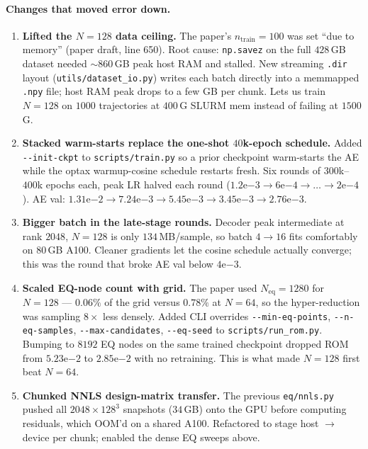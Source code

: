 \paragraph{Changes that moved error down.}
\begin{enumerate}
  \item \textbf{Lifted the $N=128$ data ceiling.} The paper's
  $n_\mathrm{train}{=}100$ was set ``due to memory'' (paper draft, line
  650). Root cause: \texttt{np.savez} on the full $428$\,GB dataset
  needed ${\sim}860$\,GB peak host RAM and stalled. New streaming
  \texttt{.dir} layout (\texttt{utils/dataset\_io.py}) writes each
  batch directly into a memmapped \texttt{.npy} file; host RAM peak
  drops to a few GB per chunk. Lets us train $N=128$ on $1000$
  trajectories at $400$\,G SLURM mem instead of failing at $1500$\,G.
  \item \textbf{Stacked warm-starts replace the one-shot $40$k-epoch
  schedule.} Added \texttt{-{}-init-ckpt} to \texttt{scripts/train.py}
  so a prior checkpoint warm-starts the AE while the optax
  warmup-cosine schedule restarts fresh. Six rounds of $300$k--$400$k
  epochs each, peak LR halved each round
  ($1.2\mathrm{e}{-3} \to 6\mathrm{e}{-4} \to \ldots \to 2\mathrm{e}{-4}$).
  AE val: $1.31\mathrm{e}{-2} \to 7.24\mathrm{e}{-3} \to
  5.45\mathrm{e}{-3} \to 3.45\mathrm{e}{-3} \to 2.76\mathrm{e}{-3}$.
  \item \textbf{Bigger batch in the late-stage rounds.} Decoder peak
  intermediate at rank $2048$, $N{=}128$ is only $134$\,MB/sample, so
  batch $4 \to 16$ fits comfortably on 80\,GB A100. Cleaner gradients
  let the cosine schedule actually converge; this was the round that
  broke AE val below $4\mathrm{e}{-3}$.
  \item \textbf{Scaled EQ-node count with grid.} The paper used
  $N_\mathrm{eq}{=}1280$ for $N{=}128$ --- $0.06\%$ of the grid versus
  $0.78\%$ at $N{=}64$, so the hyper-reduction was sampling $8\times$
  less densely. Added CLI overrides
  \texttt{-{}-min-eq-points}, \texttt{-{}-n-eq-samples}, \texttt{-{}-max-candidates},
  \texttt{-{}-eq-seed} to \texttt{scripts/run\_rom.py}. Bumping to
  $8192$ EQ nodes on the same trained checkpoint dropped ROM from
  $5.23\mathrm{e}{-2}$ to $2.85\mathrm{e}{-2}$ with no retraining.
  This is what made $N=128$ first beat $N=64$.
  \item \textbf{Chunked NNLS design-matrix transfer.} The previous
  \texttt{eq/nnls.py} pushed all $2048 \times 128^3$ snapshots
  ($34$\,GB) onto the GPU before computing residuals, which OOM'd on a
  shared A100. Refactored to stage host $\to$ device per chunk;
  enabled the dense EQ sweeps above.
\end{enumerate}

